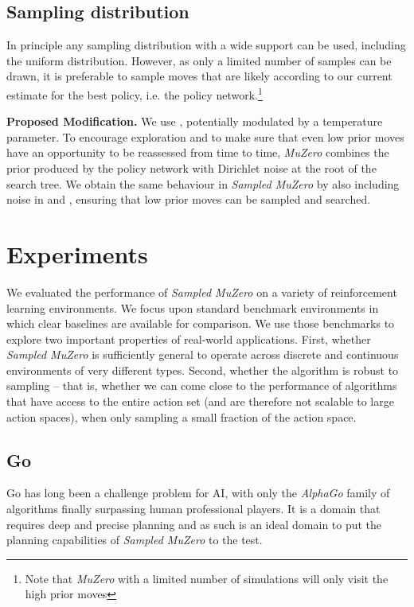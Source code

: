 \documentclass{article}
\newcommand{\muzero}{\emph{MuZero}}
\newcommand{\smuzero}{\emph{Sampled MuZero}}
\begin{document}
\subsection{Sampling distribution }

In principle any sampling distribution  with a wide support can be used, including the uniform distribution. However, as only a limited number of samples can be drawn, it is preferable to sample moves that are likely according to our current estimate for the best policy, i.e. the policy network.\footnote{Note that \muzero{} with a limited number of simulations will only visit the high prior moves}

\textbf{Proposed Modification.}
We use , potentially modulated by a temperature parameter. To encourage exploration and to make sure that even low prior moves have an opportunity to be reassessed from time to time, \muzero{} combines the prior  produced by the policy network with Dirichlet noise at the root of the search tree. We obtain the same behaviour in \smuzero{} by also including noise in  and , ensuring that low prior moves can be sampled and searched.

\section{Experiments}

We evaluated the performance of \smuzero{} on a variety of reinforcement learning environments. We focus upon standard benchmark environments in which clear baselines are available for comparison. We use those benchmarks to explore two important properties of real-world applications. First, whether \smuzero{} is sufficiently general to operate across discrete and continuous environments of very different types. Second, whether the algorithm is robust to sampling -- that is, whether we can come close to the performance of algorithms that have access to the entire action set (and are therefore not scalable to large action spaces), when only sampling a small fraction of the action space.

\subsection{Go}

Go has long been a challenge problem for AI, with only the \emph{AlphaGo} \cite{Silver16AG,Silver18AZ,muzero} family of algorithms finally surpassing human professional players. It is a domain that requires deep and precise planning and as such is an ideal domain to put the planning capabilities of \smuzero{} to the test.
\end{document}
